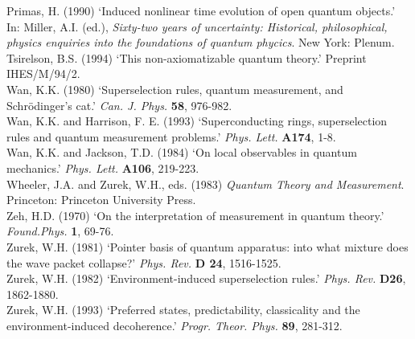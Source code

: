   Primas, H. (1990) `Induced nonlinear time evolution of open quantum objects.'
In:
 Miller,  A.I. (ed.),  {\em Sixty-two
years of uncertainty: Historical, philosophical, physics enquiries into the
foundations of quantum
phycics}. New York: Plenum.\\
 Tsirelson, B.S. (1994) `This non-axiomatizable quantum theory.' Preprint
IHES/M/94/2.\\
   Wan, K.K. (1980) `Superselection rules, quantum measurement, and
Schr\"{o}dinger's cat.'
{\em  Can.
J. Phys.} {\bf 58},  976-982.\\
Wan, K.K. and  Harrison, F. E. (1993) `Superconducting rings, superselection
rules and quantum
measurement problems.' {\em Phys. Lett.} {\bf A174}, 1-8.\\
Wan, K.K. and Jackson, T.D. (1984) `On local observables in quantum mechanics.'
 {\em Phys. Lett.} {\bf A106}, 219-223.\\
 Wheeler, J.A.  and  Zurek, W.H., eds. (1983) {\em Quantum Theory and
Measurement}.  Princeton:  Princeton University Press.\\
  Zeh, H.D. (1970) `On the interpretation of measurement in quantum theory.'
  {\em Found.Phys.} {\bf 1},  69-76.\\
 Zurek, W.H. (1981) `Pointer basis of quantum apparatus: into what mixture does
the wave
packet collapse?'   {\em  Phys. Rev.} {\bf D 24},  1516-1525.\\
  Zurek, W.H. (1982)  `Environment-induced superselection rules.'
 {\em Phys. Rev.} {\bf D26},  1862-1880.\\
  Zurek, W.H. (1993) `Preferred states, predictability, classicality and the
environment-induced decoherence.' {\em  Progr. Theor. Phys.} {\bf 89}, 281-312.
 



